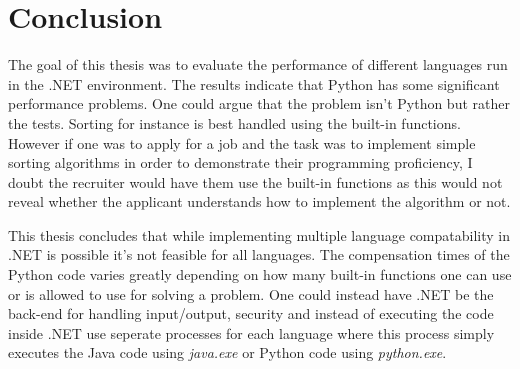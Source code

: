 \section{Conclusion}
The goal of this thesis was to evaluate the performance of different languages run in the .NET environment. The results indicate that Python has some significant performance problems. One could argue that the problem isn't Python but rather the tests. Sorting for instance is best handled using the built-in functions. However if one was to apply for a job and the task was to implement simple sorting algorithms in order to demonstrate their programming proficiency, I doubt the recruiter would have them use the built-in functions as this would not reveal whether the applicant understands how to implement the algorithm or not.

This thesis concludes that while implementing multiple language compatability in .NET is possible it's not feasible for all languages. The compensation times of the Python code varies greatly depending on how many built-in functions one can use or is allowed to use for solving a problem. One could instead have .NET be the back-end for handling input/output, security and instead of executing the code inside .NET use seperate processes for each language where this process simply executes the Java code using \textit{java.exe} or Python code using \textit{python.exe}. 